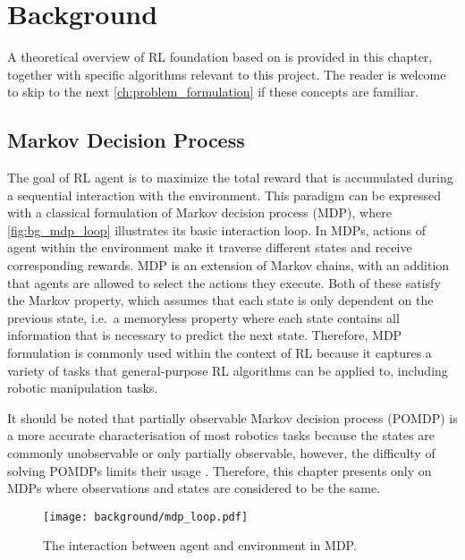 \chapter{Background}\label{ch:background}

A theoretical overview of RL foundation based on \citet{sutton_reinforcement_2018} is provided in this chapter, together with specific algorithms relevant to this project. The reader is welcome to skip to the next \autoref{ch:problem_formulation} if these concepts are familiar.


\section{Markov Decision Process}

The goal of RL agent is to maximize the total reward that is accumulated during a sequential interaction with the environment. This paradigm can be expressed with a classical formulation of Markov decision process (MDP), where \autoref{fig:bg_mdp_loop} illustrates its basic interaction loop. In MDPs, actions of agent within the environment make it traverse different states and receive corresponding rewards. MDP is an extension of Markov chains, with an addition that agents are allowed to select the actions they execute. Both of these satisfy the Markov property, which assumes that each state is only dependent on the previous state, i.e.~a memoryless property where each state contains all information that is necessary to predict the next state. Therefore, MDP formulation is commonly used within the context of RL because it captures a variety of tasks that general-purpose RL algorithms can be applied to, including robotic manipulation tasks.

It should be noted that partially observable Markov decision process (POMDP) is a more accurate characterisation of most robotics tasks because the states are commonly unobservable or only partially observable, however, the difficulty of solving POMDPs limits their usage \cite{kroemer_review_2021}. Therefore, this chapter presents only on MDPs where observations and states are considered to be the same.

\begin{figure}[ht]
    \centering
    \texttt{[image: background/mdp\_loop.pdf]}
    \caption{The interaction between agent and environment in MDP.~\protect\cite{sutton_reinforcement_2018}}
    \label{fig:bg_mdp_loop}
\end{figure}

